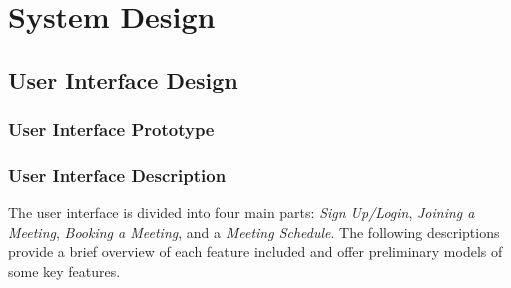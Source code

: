 \documentclass{article}
\begin{document}
\section{System Design}

\subsection{User Interface Design}

\subsubsection*{User Interface Prototype}

\subsubsection*{User Interface Description}

The user interface is divided into four main parts: \textit{Sign Up/Login}, \textit{Joining a Meeting}, \textit{Booking a Meeting}, and a \textit{Meeting Schedule}. The following descriptions provide a brief overview of each feature included and offer preliminary models of some key features.
\end{document}
